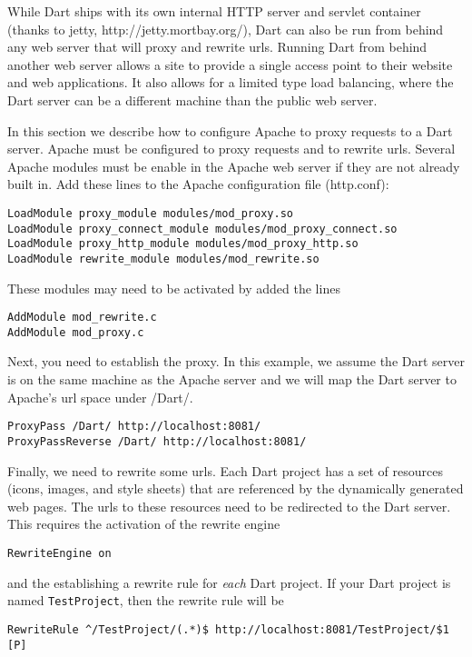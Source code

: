 \documentclass{InsightBook}
\begin{document}
While Dart ships with its own internal HTTP server and servlet
container (thanks to jetty, http://jetty.mortbay.org/), Dart can also
be run from behind any web server that will proxy and rewrite urls.
Running Dart from behind another web server allows a site to provide
a single access point to their website and web applications.  It also
allows for a limited type load balancing, where the Dart server can 
be a different machine than the public web server.

In this section we describe how to configure Apache to proxy requests
to a Dart server.  Apache must be configured to proxy requests and to 
rewrite urls.  Several Apache modules must be enable in the Apache
web server if they are not already built in. Add these lines to 
the Apache configuration file (http.conf):
\begin{verbatim}
LoadModule proxy_module modules/mod_proxy.so
LoadModule proxy_connect_module modules/mod_proxy_connect.so
LoadModule proxy_http_module modules/mod_proxy_http.so
LoadModule rewrite_module modules/mod_rewrite.so
\end{verbatim}

These modules may need to be activated by added the lines
\begin{verbatim}
AddModule mod_rewrite.c
AddModule mod_proxy.c
\end{verbatim}

Next, you need to establish the proxy.  In this example, we assume the
Dart server is on the same machine as the Apache server and we will map
the Dart server to Apache's url space under /Dart/.
\begin{verbatim}
ProxyPass /Dart/ http://localhost:8081/
ProxyPassReverse /Dart/ http://localhost:8081/
\end{verbatim}

Finally, we need to rewrite some urls.  Each Dart project has a set of
resources (icons, images, and style sheets) that are referenced by the
dynamically generated web pages.  The urls to these resources need to
be redirected to the Dart server.  This requires the activation of the rewrite engine
\begin{verbatim}
RewriteEngine on
\end{verbatim}

and the establishing a rewrite rule for \emph{each} Dart project.  If your Dart project is named \texttt{TestProject}, then the rewrite rule will be
\begin{verbatim}
RewriteRule ^/TestProject/(.*)$ http://localhost:8081/TestProject/$1 [P]
\end{verbatim}
\end{document}
